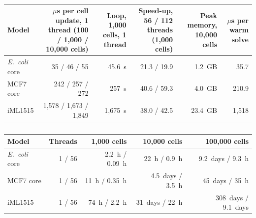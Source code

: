 \begin{table}[!htbp]
\chcolor
\centering
\caption{}
\label{tab:cost_scaling}
\footnotesize
\setlength{\tabcolsep}{4pt}
\begin{tabular}{lrrrrr}
\toprule
Model & \parbox[b]{3.4cm}{\centering $\mu$s per cell update, 1 thread (100 / 1,000 / 10,000 cells)} & \parbox[b]{2cm}{\centering Loop, 1,000 cells, 1 thread} & \parbox[b]{2.6cm}{\centering Speed-up, 56 / 112 threads (1,000 cells)} & \parbox[b]{2cm}{\centering Peak memory, 10,000 cells} & \parbox[b]{1.6cm}{\centering $\mu$s per warm solve}\\
\midrule
\textit{E.~coli} core & 35 / 46 / 55 & 45.6~s & 21.3 / 19.9 & 1.2~GB & 35.7\\
MCF7 core & 242 / 257 / 272 & 257~s & 40.6 / 59.3 & 4.0~GB & 210.9\\
iML1515 & 1,578 / 1,673 / 1,849 & 1,675~s & 38.0 / 42.5 & 23.4~GB & 1,518\\
\bottomrule
\end{tabular}
\end{table}

\begin{table}[!htbp]
\chcolor
\centering
\caption{}
\label{tab:cost_feasible}
\small
\begin{tabular}{lrrrr}
\toprule
Model & Threads & 1,000 cells & 10,000 cells & 100,000 cells\\
\midrule
\textit{E.~coli} core & 1 / 56 & 2.2~h / 0.09~h & 22~h / 0.9~h & 9.2~days / 9.3~h\\
MCF7 core & 1 / 56 & 11~h / 0.35~h & 4.5~days / 3.5~h & 45~days / 35~h\\
iML1515 & 1 / 56 & 74~h / 2.2~h & 31~days / 22~h & 308~days / 9.1~days\\
\bottomrule
\end{tabular}
\end{table}

